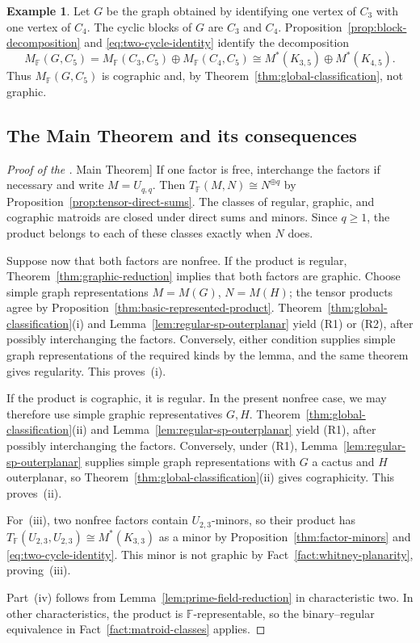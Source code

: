 \documentclass[12pt,a4paper]{article}
\numberwithin{equation}{section}
\newcommand{\F}{\mathbb F}
\newcommand{\mainthm}{\hyperref[thm:regular-two-factor]{Main Theorem}}
\theoremstyle{definition}
\newtheorem{example}[example]{Example}
\theoremstyle{remark}
\begin{document}
\begin{example}
Let \(G\) be the graph obtained by identifying one vertex of \(C_3\)
with one vertex of \(C_4\).  The cyclic blocks of \(G\) are \(C_3\) and \(C_4\).  Proposition~\ref{prop:block-decomposition} and \eqref{eq:two-cycle-identity} identify the decomposition
\[
 M_{\F}(G,C_5)= M_{\F}(C_3,C_5)\oplus M_{\F}(C_4,C_5)\cong M^*(K_{3,5})\oplus M^*(K_{4,5}).
\]
Thus \(M_{\F}(G,C_5)\) is cographic and, by
Theorem~\ref{thm:global-classification}, not graphic.
\end{example}
\subsection{The Main Theorem and its consequences}\label{subsec:regular-two-factor-proof}
\begin{proof}[Proof of the \mainthm{}]
If one factor is free, interchange the factors if necessary and write
\(M=U_{q,q}\).  Then
\(T_{\F}(M,N)\cong N^{\oplus q}\) by
Proposition~\ref{prop:tensor-direct-sums}.  The classes of regular,
graphic, and cographic matroids are closed under direct sums and
minors.  Since \(q\ge1\), the product belongs to each of these
classes exactly when \(N\) does.

Suppose now that both factors are nonfree.  If the product is
regular, Theorem~\ref{thm:graphic-reduction} implies that both
factors are graphic.  Choose simple graph representations
\(M=M(G)\), \(N=M(H)\); the tensor products agree by
Proposition~\ref{thm:basic-represented-product}.
Theorem~\ref{thm:global-classification}\textup{(i)} and
Lemma~\ref{lem:regular-sp-outerplanar} yield \textup{(R1)} or
\textup{(R2)}, after possibly interchanging the factors.
Conversely, either condition supplies simple graph representations
of the required kinds by the lemma, and the same theorem gives
regularity.  This proves~(i).

If the product is cographic, it is regular.  In the present nonfree
case, we may therefore use simple graphic representatives \(G,H\).
Theorem~\ref{thm:global-classification}\textup{(ii)} and
Lemma~\ref{lem:regular-sp-outerplanar} yield \textup{(R1)}, after
possibly interchanging the factors.  Conversely, under
\textup{(R1)}, Lemma~\ref{lem:regular-sp-outerplanar} supplies
simple graph representations with \(G\) a cactus and \(H\)
outerplanar, so Theorem~\ref{thm:global-classification}\textup{(ii)}
gives cographicity.  This proves~(ii).

For~(iii), two nonfree factors contain \(U_{2,3}\)-minors, so their
product has \(T_{\F}(U_{2,3},U_{2,3})\cong M^*(K_{3,3})\) as a minor
by Proposition~\ref{thm:factor-minors} and
\eqref{eq:two-cycle-identity}.  This minor is not graphic by
Fact~\ref{fact:whitney-planarity}, proving~(iii).

Part~(iv) follows from Lemma~\ref{lem:prime-field-reduction}
in characteristic two.  In other characteristics, the product is
\(\F\)-representable, so the binary--regular equivalence in
Fact~\ref{fact:matroid-classes} applies.
\end{proof}
\end{document}
